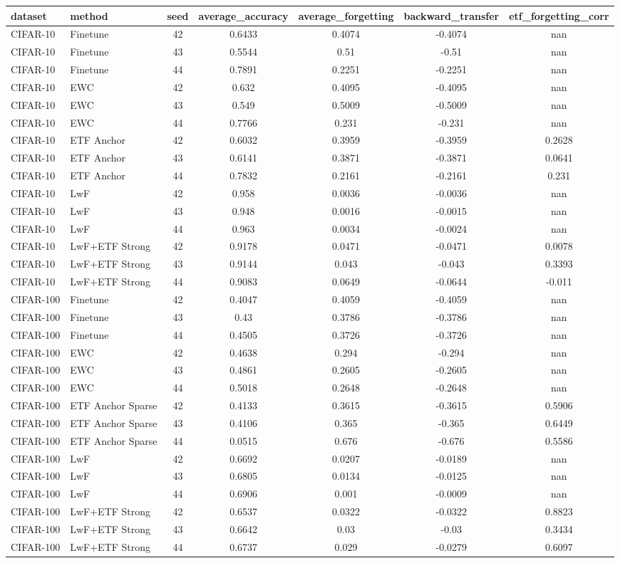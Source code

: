 \begin{tabular}{llccccc}
\hline
dataset & method & seed & average\_accuracy & average\_forgetting & backward\_transfer & etf\_forgetting\_corr \\
\hline
CIFAR-10 & Finetune & 42 & 0.6433 & 0.4074 & -0.4074 & nan \\
CIFAR-10 & Finetune & 43 & 0.5544 & 0.51 & -0.51 & nan \\
CIFAR-10 & Finetune & 44 & 0.7891 & 0.2251 & -0.2251 & nan \\
CIFAR-10 & EWC & 42 & 0.632 & 0.4095 & -0.4095 & nan \\
CIFAR-10 & EWC & 43 & 0.549 & 0.5009 & -0.5009 & nan \\
CIFAR-10 & EWC & 44 & 0.7766 & 0.231 & -0.231 & nan \\
CIFAR-10 & ETF Anchor & 42 & 0.6032 & 0.3959 & -0.3959 & 0.2628 \\
CIFAR-10 & ETF Anchor & 43 & 0.6141 & 0.3871 & -0.3871 & 0.0641 \\
CIFAR-10 & ETF Anchor & 44 & 0.7832 & 0.2161 & -0.2161 & 0.231 \\
CIFAR-10 & LwF & 42 & 0.958 & 0.0036 & -0.0036 & nan \\
CIFAR-10 & LwF & 43 & 0.948 & 0.0016 & -0.0015 & nan \\
CIFAR-10 & LwF & 44 & 0.963 & 0.0034 & -0.0024 & nan \\
CIFAR-10 & LwF+ETF Strong & 42 & 0.9178 & 0.0471 & -0.0471 & 0.0078 \\
CIFAR-10 & LwF+ETF Strong & 43 & 0.9144 & 0.043 & -0.043 & 0.3393 \\
CIFAR-10 & LwF+ETF Strong & 44 & 0.9083 & 0.0649 & -0.0644 & -0.011 \\
CIFAR-100 & Finetune & 42 & 0.4047 & 0.4059 & -0.4059 & nan \\
CIFAR-100 & Finetune & 43 & 0.43 & 0.3786 & -0.3786 & nan \\
CIFAR-100 & Finetune & 44 & 0.4505 & 0.3726 & -0.3726 & nan \\
CIFAR-100 & EWC & 42 & 0.4638 & 0.294 & -0.294 & nan \\
CIFAR-100 & EWC & 43 & 0.4861 & 0.2605 & -0.2605 & nan \\
CIFAR-100 & EWC & 44 & 0.5018 & 0.2648 & -0.2648 & nan \\
CIFAR-100 & ETF Anchor Sparse & 42 & 0.4133 & 0.3615 & -0.3615 & 0.5906 \\
CIFAR-100 & ETF Anchor Sparse & 43 & 0.4106 & 0.365 & -0.365 & 0.6449 \\
CIFAR-100 & ETF Anchor Sparse & 44 & 0.0515 & 0.676 & -0.676 & 0.5586 \\
CIFAR-100 & LwF & 42 & 0.6692 & 0.0207 & -0.0189 & nan \\
CIFAR-100 & LwF & 43 & 0.6805 & 0.0134 & -0.0125 & nan \\
CIFAR-100 & LwF & 44 & 0.6906 & 0.001 & -0.0009 & nan \\
CIFAR-100 & LwF+ETF Strong & 42 & 0.6537 & 0.0322 & -0.0322 & 0.8823 \\
CIFAR-100 & LwF+ETF Strong & 43 & 0.6642 & 0.03 & -0.03 & 0.3434 \\
CIFAR-100 & LwF+ETF Strong & 44 & 0.6737 & 0.029 & -0.0279 & 0.6097 \\
\hline
\end{tabular}
